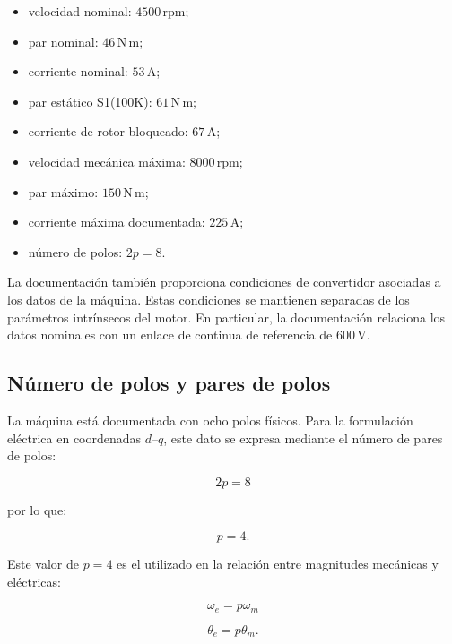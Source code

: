 \begin{itemize}
    \item velocidad nominal: $4500\,\mathrm{rpm}$;
    \item par nominal: $46\,\mathrm{N\,m}$;
    \item corriente nominal: $53\,\mathrm{A}$;
    \item par estático S1(100K): $61\,\mathrm{N\,m}$;
    \item corriente de rotor bloqueado: $67\,\mathrm{A}$;
    \item velocidad mecánica máxima: $8000\,\mathrm{rpm}$;
    \item par máximo: $150\,\mathrm{N\,m}$;
    \item corriente máxima documentada: $225\,\mathrm{A}$;
    \item número de polos: $2p=8$.
\end{itemize}

La documentación también proporciona condiciones de convertidor asociadas a los datos de la máquina. Estas condiciones se mantienen separadas de los parámetros intrínsecos del motor. En particular, la documentación relaciona los datos nominales con un enlace de continua de referencia de $600\,\mathrm{V}$.

\subsection{Número de polos y pares de polos}

La máquina está documentada con ocho polos físicos. Para la formulación eléctrica en coordenadas $d$--$q$, este dato se expresa mediante el número de pares de polos:

\begin{equation}
2p=8
\end{equation}

por lo que:

\begin{equation}
p=4.
\end{equation}

Este valor de $p=4$ es el utilizado en la relación entre magnitudes mecánicas y eléctricas:

\begin{equation}
\omega_e=p\omega_m
\end{equation}

\begin{equation}
\theta_e=p\theta_m.
\end{equation}


